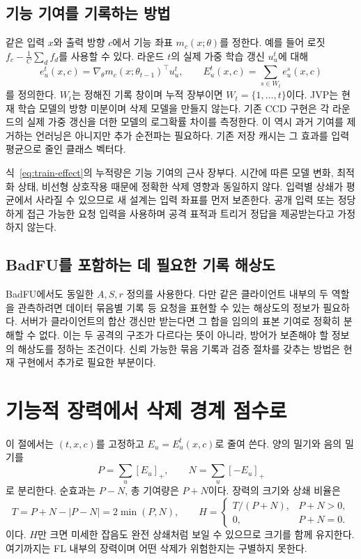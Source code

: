\documentclass[10pt,a4paper]{article}
\begin{document}
\subsection{기능 기여를 기록하는 방법}
같은 입력 $x$와 출력 방향 $c$에서 기능 좌표 $m_c(x;\theta)$를 정한다.
예를 들어 로짓 $f_c-\frac1C\sum_df_d$를 사용할 수 있다.
라운드 $t$의 실제 가중 학습 갱신 $u_u^t$에 대해
\begin{equation}\label{eq:train-effect}
 e_u^t(x,c)=\nabla_\theta m_c(x;\theta_{t-1})^\top u_u^t,\qquad
 E_u^t(x,c)=\sum_{s\in W_t}e_u^s(x,c)
\end{equation}
를 정의한다. $W_t$는 정해진 기록 창이며 누적 장부이면 $W_t=\{1,\ldots,t\}$이다.
JVP는 현재 학습 모델의 방향 미분이며 삭제 모델을 만들지 않는다.
기존 CCD 구현은 각 라운드의 실제 가중 갱신을 더한 모델의 로그확률 차이를 측정한다.
이 역시 과거 기여를 제거하는 언러닝은 아니지만 추가 순전파는 필요하다.
기존 저장 캐시는 그 효과를 입력 평균으로 줄인 클래스 벡터다.

식~\eqref{eq:train-effect}의 누적량은 기능 기여의 근사 장부다.
시간에 따른 모델 변화, 최적화 상태, 비선형 상호작용 때문에 정확한 삭제 영향과 동일하지 않다.
입력별 상쇄가 평균에서 사라질 수 있으므로 새 설계는 입력 좌표를 먼저 보존한다.
공개 입력 또는 정당하게 접근 가능한 요청 입력을 사용하며 공격 표적과 트리거 정답을 제공받는다고 가정하지 않는다.

\subsection{BadFU를 포함하는 데 필요한 기록 해상도}
BadFU에서도 동일한 $A,S,r$ 정의를 사용한다.
다만 같은 클라이언트 내부의 두 역할을 관측하려면 데이터 묶음별 기록 등
요청을 표현할 수 있는 해상도의 정보가 필요하다.
서버가 클라이언트의 합산 갱신만 받는다면 그 합을 임의의 표본 기여로 정확히 분해할 수 없다.
이는 두 공격의 구조가 다르다는 뜻이 아니라, 방어가 보존해야 할 정보의 해상도를 정하는 조건이다.
신뢰 가능한 묶음 기록과 검증 절차를 갖추는 방법은 현재 구현에서 추가로 필요한 부분이다.

\section{기능적 장력에서 삭제 경계 점수로}
이 절에서는 $(t,x,c)$를 고정하고 $E_u=E_u^t(x,c)$로 줄여 쓴다.
양의 밀기와 음의 밀기를
\begin{equation}
 P=\sum_u[E_u]_+,\qquad N=\sum_u[-E_u]_+
\end{equation}
로 분리한다. 순효과는 $P-N$, 총 기여량은 $P+N$이다.
장력의 크기와 상쇄 비율은
\begin{equation}\label{eq:tension}
 T=P+N-|P-N|=2\min(P,N),\qquad
 H=\begin{cases}T/(P+N),&P+N>0,\\0,&P+N=0.\end{cases}
\end{equation}
이다. $H$만 크면 미세한 잡음도 완전 상쇄처럼 보일 수 있으므로 크기를 함께 유지한다.
여기까지는 FL 내부의 장력이며 어떤 삭제가 위험한지는 구별하지 못한다.
\end{document}
